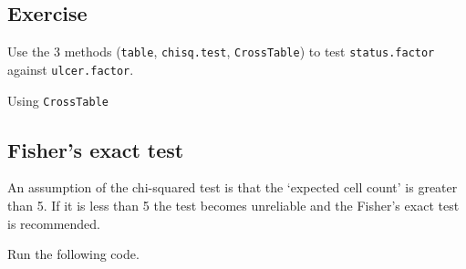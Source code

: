 \documentclass[12pt,]{krantz}
\makeatletter
\newenvironment{Shaded}{\begin{snugshade}}{\end{snugshade}}
\newcommand{\DataTypeTok}[1]{\textcolor[rgb]{0.13,0.29,0.53}{#1}}
\newcommand{\KeywordTok}[1]{\textcolor[rgb]{0.13,0.29,0.53}{\textbf{#1}}}
\newcommand{\NormalTok}[1]{#1}
\newcommand{\OperatorTok}[1]{\textcolor[rgb]{0.81,0.36,0.00}{\textbf{#1}}}
\newcommand{\OtherTok}[1]{\textcolor[rgb]{0.56,0.35,0.01}{#1}}
\newenvironment{kframe}{%
\medskip{}
\setlength{\fboxsep}{.8em}
 \def\at@end@of@kframe{}%
 \ifinner\ifhmode%
  \def\at@end@of@kframe{\end{minipage}}%
  \begin{minipage}{\columnwidth}%
 \fi\fi%
 \def\FrameCommand##1{\hskip\@totalleftmargin \hskip-\fboxsep
 \colorbox{shadecolor}{##1}\hskip-\fboxsep
     \hskip-\linewidth \hskip-\@totalleftmargin \hskip\columnwidth}%
 \MakeFramed {\advance\hsize-\width
   \@totalleftmargin\z@ \linewidth\hsize
   \@setminipage}}%
 {\par\unskip\endMakeFramed%
 \at@end@of@kframe}
\renewenvironment{Shaded}{\begin{kframe}}{\end{kframe}}
\theoremstyle{definition}
\theoremstyle{definition}
\theoremstyle{definition}
\theoremstyle{remark}
\makeatother
\begin{document}
\hypertarget{exercise-25}{%
\subsection{Exercise}\label{exercise-25}}

Use the 3 methods (\texttt{table}, \texttt{chisq.test},
\texttt{CrossTable}) to test \texttt{status.factor} against
\texttt{ulcer.factor}.

\begin{Shaded}
\end{Shaded}

Using \texttt{CrossTable}

\begin{Shaded}
\end{Shaded}

\hypertarget{fishers-exact-test}{%
\subsection{Fisher's exact test}\label{fishers-exact-test}}

An assumption of the chi-squared test is that the `expected cell count'
is greater than 5. If it is less than 5 the test becomes unreliable and
the Fisher's exact test is recommended.

Run the following code.

\begin{Shaded}
\end{Shaded}
\end{document}
